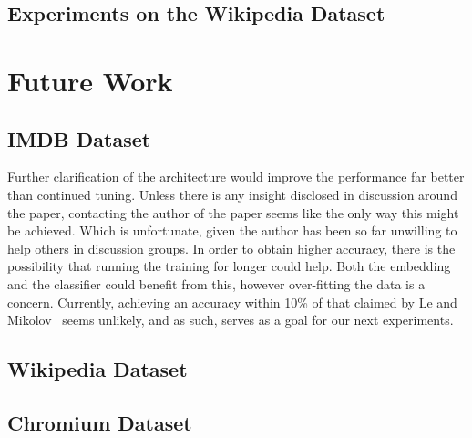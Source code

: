 \documentclass[11pt]{article}
\begin{document}
  \subsection*{Experiments on the Wikipedia Dataset}

\section*{Future Work}
  \subsection*{IMDB Dataset}
    Further clarification of the architecture would improve the performance far better
    than continued tuning. Unless there is any insight disclosed in discussion around
    the paper, contacting the author of the paper seems like the only way this might be
    achieved. Which is unfortunate, given the author has been so far unwilling to
    help others in discussion groups.
    In order to obtain higher accuracy, there is the possibility that running the
    training for longer could help. Both the embedding and the classifier could benefit
    from this, however over-fitting the data is a concern.
    Currently, achieving an accuracy within 10\% of that claimed by Le
    and Mikolov~\cite{le2014distributed} seems unlikely, and as such, serves as
    a goal for our next experiments.

  \subsection*{Wikipedia Dataset}

  \subsection*{Chromium Dataset}

\newpage
\printbibliography
\end{document}
